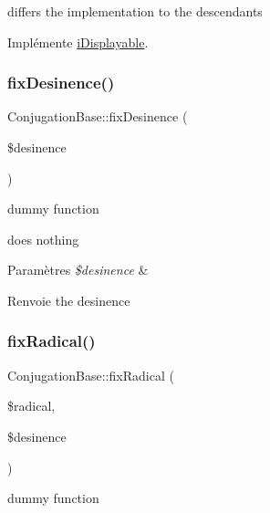 differs the implementation to the descendants 

Implémente \hyperlink{interfaceiDisplayable}{i\+Displayable}.

\hypertarget{classConjugationBase_ab983db20dcc0f19fdce07fd4a8fdbc18}{}\label{classConjugationBase_ab983db20dcc0f19fdce07fd4a8fdbc18} 
\subsubsection{\texorpdfstring{fix\+Desinence()}{fixDesinence()}}
{\footnotesize\ttfamily Conjugation\+Base\+::fix\+Desinence (\begin{DoxyParamCaption}\item[{}]{\$desinence }\end{DoxyParamCaption})\hspace{0.3cm}{\ttfamily [protected]}}



dummy function 

does nothing


\begin{DoxyParams}{Paramètres}
{\em \$desinence} & \\
\hline
\end{DoxyParams}
\begin{DoxyReturn}{Renvoie}
the desinence 
\end{DoxyReturn}
\hypertarget{classConjugationBase_ab55301132f0c90c3b5bf7f6cb44fc6b4}{}\label{classConjugationBase_ab55301132f0c90c3b5bf7f6cb44fc6b4} 
\subsubsection{\texorpdfstring{fix\+Radical()}{fixRadical()}}
{\footnotesize\ttfamily Conjugation\+Base\+::fix\+Radical (\begin{DoxyParamCaption}\item[{}]{\$radical,  }\item[{}]{\$desinence }\end{DoxyParamCaption})\hspace{0.3cm}{\ttfamily [protected]}}



dummy function 

